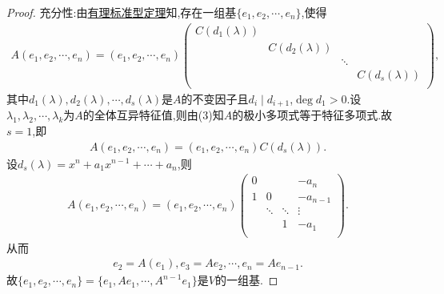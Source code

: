 \documentclass[../../main.tex]{subfiles}%
\begin{document}
\begin{proof}
{\heiti 充分性:}由\hyperref[theorem:有理标准型核心定理]{有理标准型定理}知,存在一组基$\{ e_1,e_2,\cdots ,e_n \}$,使得
\begin{align}
A\left( e_1,e_2,\cdots ,e_n \right) =\left( e_1,e_2,\cdots ,e_n \right) \begin{pmatrix}
C\left( d_1\left( \lambda \right) \right)&        &        &        \\
&        C\left( d_2\left( \lambda \right) \right)&        &        \\
&        &        \ddots&        \\
&        &        &        C\left( d_s\left( \lambda \right) \right)\\
\end{pmatrix},\label{eq:fserijj90wit903kv0dks90jkg3ugj4gjn89hjdfgj9j03u9gj9jsdfsivjmi45ygdfgbn21.1}
\end{align}
其中$d_1\left( \lambda \right) ,d_2\left( \lambda \right) ,\cdots ,d_s\left( \lambda \right)$是$A$的不变因子且$d_i\mid d_{i+1}$,$\deg d_1>0$.设$\lambda _1,\lambda _2,\cdots ,\lambda _k$为$A$的全体互异特征值,则由(3)知$A$的极小多项式等于特征多项式.故$s=1$,即
\begin{align*}
A\left( e_1,e_2,\cdots ,e_n \right) =\left( e_1,e_2,\cdots ,e_n \right) C\left( d_s\left( \lambda \right) \right).
\end{align*}
设$d_s\left( \lambda \right) =x^n+a_1x^{n-1}+\cdots +a_n$,则
\begin{align*}
A\left( e_1,e_2,\cdots ,e_n \right) =\left( e_1,e_2,\cdots ,e_n \right) \begin{pmatrix}
0&        &        &        -a_n\\
1&        0&        &        -a_{n-1}\\
&        \ddots&        \ddots&        \vdots\\
&        &        1&        -a_1\\
\end{pmatrix}.
\end{align*}
从而
\begin{align*}
e_2=A\left( e_1 \right) ,e_3=Ae_2,\cdots ,e_n=Ae_{n-1}.
\end{align*}
故$\{ e_1,e_2,\cdots ,e_n \}=\{ e_1,Ae_1,\cdots ,A^{n-1}e_1 \}$是$V$的一组基.


\end{proof}
\end{document}
